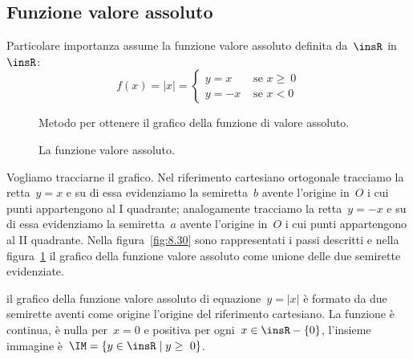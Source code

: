 \vspazio\ovalbox{\risolvi \ref{ese:8.63}}

\subsection{Funzione valore assoluto}
Particolare importanza assume la funzione valore assoluto definita da~$\insR$ in~$\insR$:
\[
f(x)=|x|=
\begin{cases}
y=x & \text{ se }x\ge~0\\
y=-x & \text{ se }x<0
\end{cases}
\]


\begin{figure}[htb]
\begin{minipage}[t]{.45\textwidth}
\centering
\caption{Metodo per ottenere il grafico della funzione di valore assoluto.}\label{fig:8.30}
\end{minipage}\hfil
\begin{minipage}[t]{.45\textwidth}
\centering
\caption{La funzione valore assoluto.}\label{fig:8.31}
\end{minipage}
\end{figure}

Vogliamo tracciarne il grafico. Nel riferimento cartesiano ortogonale tracciamo la retta~$y=x$ e su di essa evidenziamo
la semiretta~$b$ avente l'origine in~$O$ i cui punti appartengono al I quadrante; analogamente tracciamo la retta~$y=-x$
e su di essa evidenziamo la semiretta~$a$ avente l'origine in~$O$ i cui punti appartengono al II quadrante.
Nella figura~\ref{fig:8.30} sono rappresentati i passi descritti e nella figura~\ref{fig:8.31} il grafico della funzione valore assoluto come unione delle due semirette evidenziate.

\conclusione il grafico della funzione valore assoluto di equazione~$y=|x|$ è formato da due semirette aventi come origine
l'origine del riferimento cartesiano. La funzione è continua, è nulla per~$x=0$ e positiva per ogni~$x\in \insR-\{0\}$,
l'insieme immagine è~$\IM=\{y\in \insR\mid  y\ge~0\}$.

\vspazio\ovalbox{\risolvii \ref{ese:8.64}, \ref{ese:8.65}, \ref{ese:8.66}}

\newpage

\cleardoublepage
